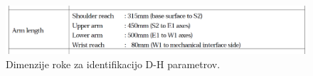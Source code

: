 \begin{figure}
  \includegraphics[width=\linewidth]{./Slike/arm_length.png}
  \caption{Dimenzije roke za identifikacijo D-H parametrov.}
  \label{fig:pa10armlength}
\end{figure}